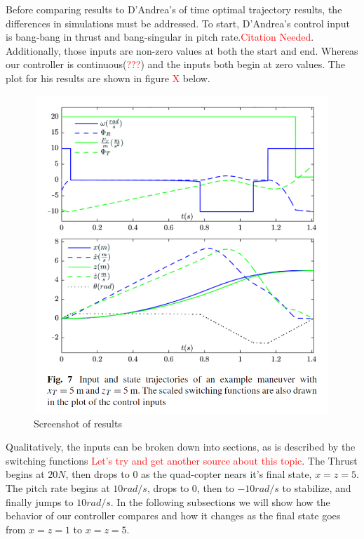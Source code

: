 \documentclass[12pt]{article}
\begin{document}
Before comparing results to D'Andrea's of time optimal trajectory results, the differences in simulations must be addressed. To start, D'Andrea's control input is bang-bang in thrust and bang-singular in pitch rate.\textcolor{red}{Citation Needed}. Additionally, those inputs are non-zero values at both the start and end. Whereas our controller is continuous(\textcolor{red}{???}) and the inputs both begin at zero values. The plot for his results are shown in figure \textcolor{red}{X} below. 
\begin{figure}[H]
\centerline{\includegraphics[width=12cm, height=12cm]{DAndrea_55_Plot.png}}
  \caption{\label{D'Andrea Plot} Screenshot of results}
  \label{fig}
\end{figure}
Qualitatively, the inputs can be broken down into sections, as is described by the switching functions \textcolor{red}{Let's try and get another source about this topic}. The Thrust begins at $20 N$, then drops to 0 as the quad-copter nears it's final state, $x=z=5$. The pitch rate begins at $10 rad/s$, drops to $0$, then to $-10 rad/s$ to stabilize, and finally jumps to $10 rad/s$. 
\newline
\newline
In the following subsections we will show how the behavior of our controller compares and how it changes as the final state goes from $x=z=1$ to $x=z=5$.
\end{document}

